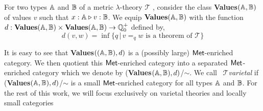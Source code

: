 \documentclass[10pt,a4paper]{amsart}
\theoremstyle{definition}
\theoremstyle{definition}
\theoremstyle{definition}
\theoremstyle{definition}
\theoremstyle{definition}
\theoremstyle{definition}
\begin{document}
For two types $\mathbb{A}$ and $\mathbb{B}$ of a metric $\lambda$-theory $\mathscr{T}$ , consider the class \textbf{Values}$(\mathbb{A},\mathbb{B})$ of values $v$ such that $x : \mathbb{A} \triangleright v : \mathbb{B}$. We equip $\textbf{Values}(\mathbb{A},\mathbb{B})$ with the function $d :\textbf{Values}(\mathbb{A},\mathbb{B}) \times \textbf{Values}(\mathbb{A},\mathbb{B}) \rightarrow \mathbb{Q}^{+}_0$ defined by,
$$d(v,w)=\inf{\{q \, \vert \, v=_q w \text{ is a theorem of } \mathscr{T} \}}$$

It is easy to see that \textbf{Values}$((\mathbb{A},\mathbb{B}),d)$ is a (possibly large)  $\mathsf{Met}$-enriched category. We then quotient this  $\mathsf{Met}$-enriched category into a separated  $\mathsf{Met}$-enriched category which we denote by (\textbf{Values}$(\mathbb{A},\mathbb{B}),d)$/$\sim$. We call  $\mathscr{T} $\emph{varietal} if (\textbf{Values}$(\mathbb{A},\mathbb{B}),d)$/$\sim$ is a small  $\mathsf{Met}$-enriched category for all types $\mathbb{A}$ and $\mathbb{B}$. For the rest of this work, we will focus exclusively on varietal theories and locally small categories
\end{document}
